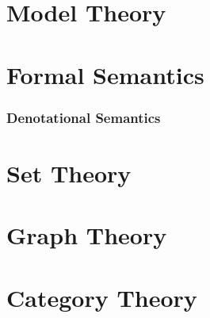 \documentclass{article}
\begin{document}

\part{Model Theory}


\part{Formal Semantics}

\section{Denotational Semantics}


\part{Set Theory}


\part{Graph Theory}


\part{Category Theory}

\end{document}
